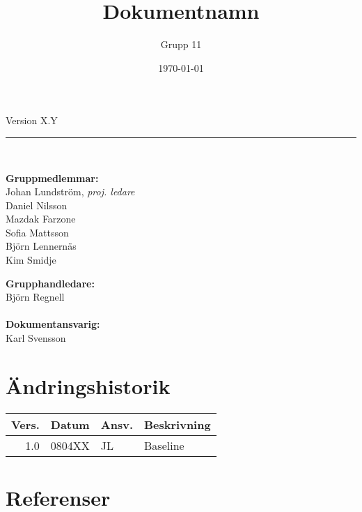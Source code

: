 \documentclass[a4paper]{article}
\title{Dokumentnamn}					%
\author{Grupp 11}
\date{\today}
\begin{document}
\maketitle

\begin{center}
\large{Version X.Y}   			%
\ \\[1cm]
\hrule
\ \\[1cm]
\begin{minipage}{0.5\textwidth}
	\begin{flushleft} \large
		\textbf{Gruppmedlemmar:} \\
		Johan Lundström, \emph{proj. ledare} \\
		Daniel Nilsson \\
		Mazdak Farzone \\
		Sofia Mattsson \\
		Björn Lennernäs \\
		Kim Smidje
	\end{flushleft}
\end{minipage}
\begin{minipage}{0.4\textwidth}
	\begin{flushright} \large
		\textbf{Grupphandledare:} \\
		Björn Regnell \\	
		\ \\				
		\textbf{Dokumentansvarig:} \\
		Karl Svensson					%
	\end{flushright}
\end{minipage}
\end{center}

\clearpage

\tableofcontents
\newpage

%
%

\section{Ändringshistorik} %

\begin{tabular}{r|l|l|p{7cm}}
\textbf{Vers.}		&	\textbf{Datum}	&	\textbf{Ansv.}	&	\textbf{Beskrivning} \\
\hline
1.0			&	0804XX	&	JL			&	Baseline 		%
\end{tabular}


\section{Referenser}
\renewcommand*{\refname}{}
\vspace{-1cm} %

\begin{thebibliography}{99}
\end{thebibliography}
\end{document}
